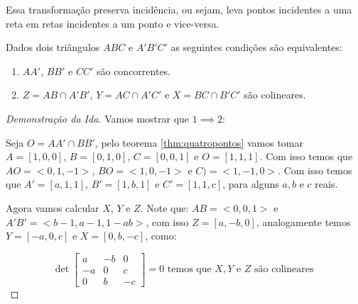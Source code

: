 \begin{thm}
Essa transformação preserva incidência, ou sejam, leva pontos incidentes a uma reta em retas incidentes a um ponto e vice-versa.
\end{thm}

\begin{thm}
Dados dois triângulos $ABC$ e $A'B'C'$ as seguintes condições são equivalentes:
\begin{enumerate}
    \item $AA'$, $BB'$ e $CC'$ são concorrentes.
    \item $Z = AB \cap A'B'$, $Y = AC\cap A'C'$ e $X = BC \cap B'C'$ são colineares.
\end{enumerate}
\end{thm}

\begin{proof}[Demonstração da Ida]
Vamos mostrar que $1 \implies 2$:

Seja $O = AA' \cap BB'$, pelo teorema \ref{thm:quatropontos} vamos tomar $A = [1, 0, 0]$, $B = [0, 1, 0]$, $C = [0, 0, 1]$ e $O = [1, 1, 1]$. Com isso temos que $AO = < 0, 1, -1>$, $BO = < 1, 0, -1>$ e $C) = < 1, -1, 0>$. Com isso temos que $A' = [a,1,1]$, $B' = [1,b,1]$ e $C'= [1,1,c]$, para alguns $a,b$ e $c$ reais. 

Agora vamos calcular $X$, $Y$ e $Z$. Note que: $AB = <0,0,1>$ e $A'B' = <b-1,a-1,1-ab>$, com isso $Z = [a,-b,0]$, analogamente temos $Y = [-a,0,c]$ e $X = [0,b,-c]$, como:

\[\det \begin{bmatrix} a & -b & 0 \\ -a & 0 & c \\ 0 & b & -c \end{bmatrix} = 0 \text{ temos que } X,Y \text{ e } Z \text{ são colineares } \]
\end{proof}


